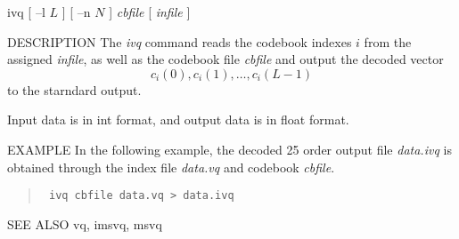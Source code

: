 
\begin{synopsis}
\item [ivq] [ --l $L$ ] [ --n $N$ ] {\em cbfile}  [ {\em infile} ] 
\end{synopsis}

\begin{qsection}{DESCRIPTION}
The {\em ivq} command reads the codebook indexes $i$ from 
the assigned {\em infile}, as well as the codebook file {\em cbfile}
and output the decoded vector
\begin{displaymath}
  c_i(0),c_i(1),\ldots,c_i(L-1)
\end{displaymath}
to the starndard output.
\par
Input data is in int format, and output data is in float format.
\end{qsection}

\begin{options}
\end{options}

\begin{qsection}{EXAMPLE}
In the following example,
the decoded 25 order output file {\em data.ivq} is obtained
through the index file {\em data.vq} and codebook {\em cbfile}.
\begin{quote}
\verb! ivq cbfile data.vq > data.ivq !
\end{quote}
\end{qsection}

\begin{qsection}{SEE ALSO}
vq, imsvq, msvq
\end{qsection}
